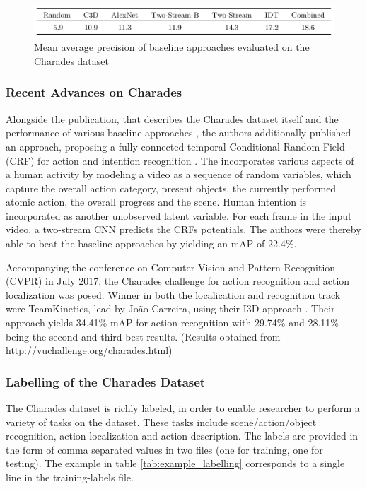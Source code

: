 \begin{figure}[H]
    \centering
    \includegraphics[width=\textwidth]{img_datasets/charades_baseline_results}
    \caption{Mean average precision of baseline approaches evaluated on the Charades dataset \cite{sigurdsson_hollywood_2016}}
    \label{fig:charades_baseline_results}
\end{figure}

\subsubsection{Recent Advances on Charades}

Alongside the publication, that describes the Charades dataset itself and the performance of various baseline approaches \cite{sigurdsson_hollywood_2016}, the authors additionally published an approach, proposing a fully-connected temporal Conditional Random Field (CRF) for action and intention recognition \cite{sigurdsson_asynchronous_2016}.
The incorporates various aspects of a human activity by modeling a video as a sequence of random variables, which capture the overall action category, present objects, the currently performed atomic action, the overall progress and the scene.
Human intention is incorporated as another unobserved latent variable.
For each frame in the input video, a two-stream CNN predicts the CRFs potentials.
The authors were thereby able to beat the baseline approaches by yielding an mAP of 22.4\%.

Accompanying the conference on Computer Vision and Pattern Recognition (CVPR) in July 2017, the Charades challenge for action recognition and action localization was posed.
Winner in both the localication and recognition track were TeamKinetics, lead by João Carreira, using their I3D approach \cite{carreira_quo_2017}.
Their approach yields 34.41\% mAP for action recognition with 29.74\% and 28.11\% being the second and third best results.
(Results obtained from \url{http://vuchallenge.org/charades.html})


\subsubsection{Labelling of the Charades Dataset}
\label{subsec:charadeslabelling}

The Charades dataset is richly labeled, in order to enable researcher to perform a variety of tasks on the dataset.
These tasks include scene/action/object recognition, action localization and action description.
The labels are provided in the form of comma separated values in two files (one for training, one for testing).
The example in table \ref{tab:example_labelling} corresponds to a single line in the training-labels file.

